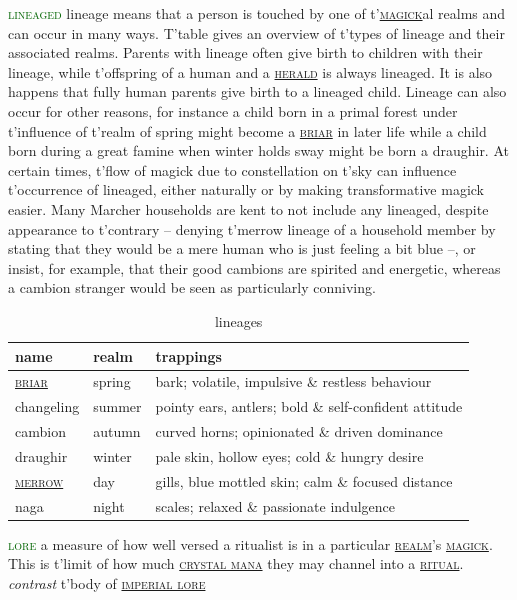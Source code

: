 \documentclass[twoside,11pt,b5paper,twocolumn]{scrbook}
\newcommand{\estcab}[1]{\textsc{\textcolor{marron}{#1}}}
\newcommand{\keyword}[1]{\textcolor{darkgreen}{#1}}
\renewcommand{\paragraph}[1]{\par\noindent\markboth{#1}{#1}\estcab{\keyword{#1}}\label{#1} }
\newcommand{\see}[1]{{\estcab{\hyperref[#1]{#1}}}}
\begin{document}
\paragraph{lineaged} lineage means that a person is touched by one of t'\see{magick}al realms and can occur in many ways. T'table gives an overview of t'types of lineage and their associated realms. Parents with lineage often give birth to children with their lineage, while t'offspring of a human and a \see{herald} is always lineaged. It is also happens that fully human parents give birth to a lineaged child. Lineage can also occur for other reasons, for instance a child born in a primal forest under t'influence of t'realm of spring might become a \see{briar} in later life while a child born during a great famine when winter holds sway might be born a draughir. At certain times, t'flow of magick due to constellation on t'sky can influence t'occurrence of lineaged, either naturally or by making transformative magick easier. Many Marcher households are kent to not include any lineaged, despite appearance to t'contrary – denying t'merrow lineage of a household member by stating that they would be a mere human who is just feeling a bit blue –, or insist, for example, that their good cambions are spirited and energetic, whereas a cambion stranger would be seen as particularly conniving.\begin{table}\begin{tabular}{lll} name& realm& trappings\\ \hline \see{briar}& spring& bark; volatile, impulsive \& restless behaviour\\ changeling& summer& pointy ears, antlers; bold \& self-confident attitude\\ cambion& autumn& curved horns; opinionated \& driven dominance\\ draughir& winter& pale skin, hollow eyes; cold \& hungry desire\\ \see{merrow}& day& gills, blue mottled skin; calm \& focused distance\\ naga& night& scales; relaxed \& passionate indulgence\end{tabular}\caption{lineages}\end{table}
\paragraph{lore} a measure of how well versed a ritualist is in a particular \see{realm}'s \see{magick}. This is t'limit of how much \see{crystal mana} they may channel into a \see{ritual}. \textit{contrast} t'body of \see{imperial lore}
\end{document}
